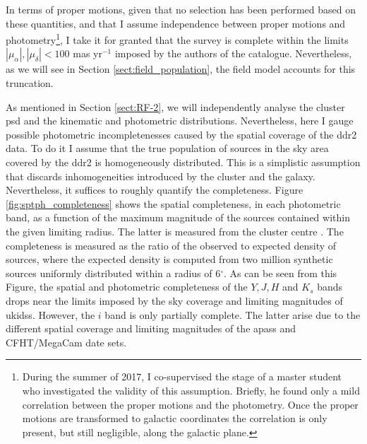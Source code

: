 In terms of proper motions, given that no selection has been performed based on these quantities, and that I assume independence between proper motions and photometry\footnote{During the summer of 2017, I co-supervised the stage of a master student who investigated the validity of this assumption. Briefly, he found only a mild correlation between the proper motions and the photometry. Once the proper motions are transformed to galactic coordinates the correlation is only present, but still negligible, along the galactic plane.}, I take it for granted that the survey is complete within the limits $|\mu_{\alpha}|,|\mu_{\delta}| < 100$ mas yr$^{-1}$ imposed by the authors of the catalogue. Nevertheless, as we will see in Section \ref{sect:field_population}, the field model accounts for this truncation.

As mentioned in Section \ref{sect:RF-2}, we will independently analyse the cluster \gls{psd} and the kinematic and photometric distributions. Nevertheless, here I gauge possible photometric incompletenesses caused by the spatial coverage of the \gls{ddr2} data. To do it I assume that the true population of sources in the sky area covered by the \gls{ddr2} is homogeneously distributed. This is a simplistic assumption that discards inhomogeneities introduced by the cluster and the galaxy. Nevertheless, it suffices to roughly quantify the completeness. Figure \ref{fig:sptph_completeness} shows the spatial completeness, in each photometric band, as a function of the maximum magnitude of the sources contained within the given limiting radius. The latter is measured from the cluster centre \cite[R.A. = 56.65$^\circ$, Dec. = 24.13$^\circ$][]{Bouy2015}. The completeness is measured as the ratio of the observed to expected density of sources, where the expected density is computed from two million synthetic sources uniformly distributed within a radius of 6$^\circ$. As can be seen from this Figure, the spatial and photometric completeness of the $Y,J,H$ and $K_s$ bands drops near the limits imposed by the sky coverage and limiting magnitudes of \gls{ukidss}. However, the $i$ band is only partially complete. The latter arise due to the different spatial coverage and limiting magnitudes of the \gls{apass} and CFHT/MegaCam date sets.

